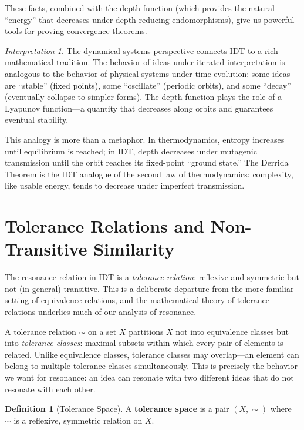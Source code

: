 \documentclass[11pt,openany]{book}
\theoremstyle{definition}
\newtheorem{definition}[axiom]{Definition}
\theoremstyle{plain}
\theoremstyle{remark}
\newtheorem{interpretation}[axiom]{Interpretation}
\begin{document}
These facts, combined with the depth function (which provides the natural ``energy'' that decreases under depth-reducing endomorphisms), give us powerful tools for proving convergence theorems.

\begin{interpretation}
The dynamical systems perspective connects IDT to a rich mathematical tradition. The behavior of ideas under iterated interpretation is analogous to the behavior of physical systems under time evolution: some ideas are ``stable'' (fixed points), some ``oscillate'' (periodic orbits), and some ``decay'' (eventually collapse to simpler forms). The depth function plays the role of a Lyapunov function---a quantity that decreases along orbits and guarantees eventual stability.

This analogy is more than a metaphor. In thermodynamics, entropy increases until equilibrium is reached; in IDT, depth decreases under mutagenic transmission until the orbit reaches its fixed-point ``ground state.'' The Derrida Theorem is the IDT analogue of the second law of thermodynamics: complexity, like usable energy, tends to decrease under imperfect transmission.
\end{interpretation}

\section{Tolerance Relations and Non-Transitive Similarity}

The resonance relation in IDT is a \emph{tolerance relation}: reflexive and symmetric but not (in general) transitive. This is a deliberate departure from the more familiar setting of equivalence relations, and the mathematical theory of tolerance relations underlies much of our analysis of resonance.

A tolerance relation $\sim$ on a set $X$ partitions $X$ not into equivalence classes but into \emph{tolerance classes}: maximal subsets within which every pair of elements is related. Unlike equivalence classes, tolerance classes may overlap---an element can belong to multiple tolerance classes simultaneously. This is precisely the behavior we want for resonance: an idea can resonate with two different ideas that do not resonate with each other.

\begin{definition}[Tolerance Space]
A \textbf{tolerance space} is a pair $(X, \sim)$ where $\sim$ is a reflexive, symmetric relation on $X$.
\end{definition}
\end{document}
